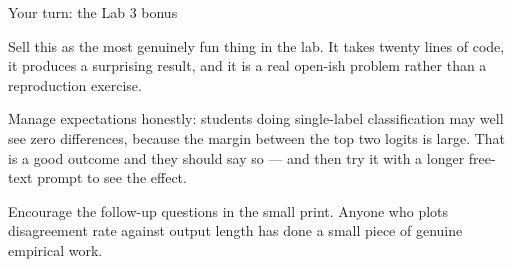 \documentclass[aspectratio=169,10pt]{beamer}
\begin{document}
\begin{frame}{Your turn: the Lab 3 bonus}
{  Sell this as the most genuinely fun thing in the lab. It takes twenty lines
  of code, it produces a surprising result, and it is a real open-ish problem
  rather than a reproduction exercise.

  Manage expectations honestly: students doing single-label classification may
  well see zero differences, because the margin between the top two logits is
  large. That is a good outcome and they should say so --- and then try it with
  a longer free-text prompt to see the effect.

  Encourage the follow-up questions in the small print. Anyone who plots
  disagreement rate against output length has done a small piece of genuine
  empirical work.}
\end{frame}
\fi

\end{document}
